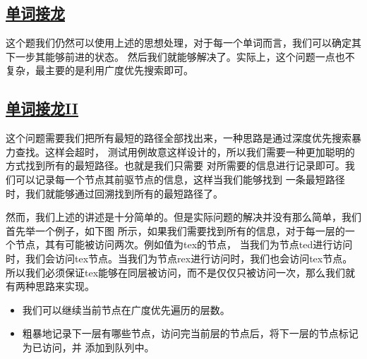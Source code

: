 \documentclass[../../main.tex]{subfiles}
\begin{document}


\subsection{\href{https://leetcode.cn/problems/word-ladder/}{单词接龙}}

这个题我们仍然可以使用上述的思想处理，对于每一个单词而言，我们可以确定其下一步其能够前进的状态。
然后我们就能够解决了。实际上，这个问题一点也不复杂，最主要的是利用广度优先搜索即可。



\subsection{\href{https://leetcode.cn/problems/word-ladder-ii/}{单词接龙II}}

这个问题需要我们把所有最短的路径全部找出来，一种思路是通过深度优先搜索暴力查找。这样会超时，
测试用例故意这样设计的，所以我们需要一种更加聪明的方式找到所有的最短路径。也就是我们只需要
对所需要的信息进行记录即可。我们可以记录每一个节点其前驱节点的信息，这样当我们能够找到
一条最短路径时，我们就能够通过回溯找到所有的最短路径了。

然而，我们上述的讲述是十分简单的。但是实际问题的解决并没有那么简单，我们首先举一个例子，如下图
所示，如果我们需要找到所有的信息，对于每一层的一个节点，其有可能被访问两次。例如值为tex的节点，
当我们为节点ted进行访问时，我们会访问tex节点。当我们为节点rex进行访问时，我们也会访问tex节点。
所以我们必须保证tex能够在同层被访问，而不是仅仅只被访问一次，那么我们就有两种思路来实现。

\begin{itemize}
  \item 我们可以继续当前节点在广度优先遍历的层数。
  \item 粗暴地记录下一层有哪些节点，访问完当前层的节点后，将下一层的节点标记为已访问，并
  添加到队列中。
\end{itemize}
\end{document}
